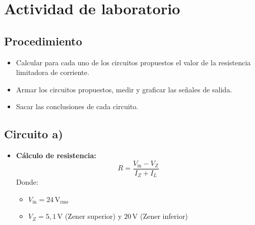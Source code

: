 \documentclass[chaptersright]{informeutn}
\begin{document}
  
  \section{Actividad de laboratorio}

\subsection*{Procedimiento}

\begin{itemize}
    \item Calcular para cada uno de los circuitos propuestos el valor de la resistencia limitadora de corriente.
    \item Armar los circuitos propuestos, medir y graficar las señales de salida.
    \item Sacar las conclusiones de cada circuito.
\end{itemize}

\subsection*{Circuito a)}

\begin{itemize}
    \item \textbf{Cálculo de resistencia:} 
    \[
    R = \frac{V_{\text{in}} - V_Z}{I_Z + I_L}
    \]
    Donde:
    \begin{itemize}
        \item \( V_{\text{in}} = 24\,\text{V}_{\text{rms}} \)
        \item \( V_Z = 5{,}1\,\text{V} \) (Zener superior) y \( 20\,\text{V} \) (Zener inferior)
    \end{itemize}
\end{itemize}
\end{document}
